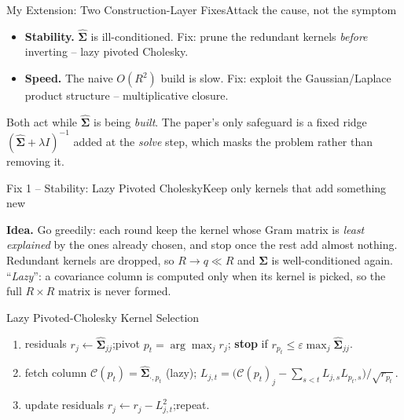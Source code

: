 \documentclass[aspectratio=169,10pt]{beamer}
\newcommand{\pos}[1]{\textcolor{fudanblue}{#1}}
\newcommand{\HL}[1]{\textcolor{accentgreen}{#1}}
\newcommand{\Sig}{\hat{\boldsymbol{\Sigma}}}        %
\begin{document}
\begin{frame}{My Extension: Two Construction-Layer Fixes}{Attack the cause, not the symptom}

\vspace{0.18cm}
\begin{itemize}\setlength\itemsep{0.45cm}
  \item \textbf{\pos{Stability.}} $\Sig$ is ill-conditioned. \HL{Fix:} prune the redundant
        kernels \emph{before} inverting -- lazy pivoted Cholesky.
  \item \textbf{\pos{Speed.}} The naive $O(R^2)$ build is slow. \HL{Fix:} exploit the
        Gaussian/Laplace product structure -- multiplicative closure.
\end{itemize}

\vspace{0.35cm}
Both act while $\Sig$ is being \emph{built}. The paper's only safeguard is a fixed ridge
$(\Sig+\lambda I)^{-1}$ added at the \emph{solve} step, which masks the problem rather than
removing it.

\end{frame}

\begin{frame}{Fix 1 -- Stability: Lazy Pivoted Cholesky}{Keep only kernels that add something new}

\vspace{0.04cm}
\textbf{Idea.} Go greedily: each round keep the kernel whose Gram matrix is
\emph{least explained} by the ones already chosen, and stop once the rest add almost
nothing. Redundant kernels are dropped, so $R\to q\ll R$ and $\Sig$ is well-conditioned again.
``\emph{Lazy}'': a covariance column is computed only when its kernel is picked, so the full
$R\times R$ matrix is never formed.

\vspace{0.12cm}
\begin{block}{Lazy Pivoted-Cholesky Kernel Selection}
\small
\begin{enumerate}\setlength\itemsep{2.2pt}
  \item residuals $r_j \leftarrow \Sig_{jj}$;\quad pivot $p_t=\arg\max_j r_j$;\quad
        \textbf{stop} if $r_{p_t}\le \varepsilon\max_j \Sig_{jj}$.
  \item fetch column $\mathcal C(p_t)=\Sig_{\cdot,p_t}$ (lazy);\quad
        $L_{j,t}=\big(\mathcal C(p_t)_j-\textstyle\sum_{s<t}L_{j,s}L_{p_t,s}\big)/\sqrt{r_{p_t}}$.
  \item update residuals $r_j \leftarrow r_j-L_{j,t}^{2}$;\quad repeat.
\end{enumerate}
\end{block}

\end{frame}
\end{document}
